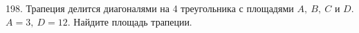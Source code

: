 198. Трапеция делится диагоналями на 4 треугольника с площадями $A,\ B,\ C$ и $D.$ $A=3,\ D=12.$ Найдите площадь трапеции.\\
